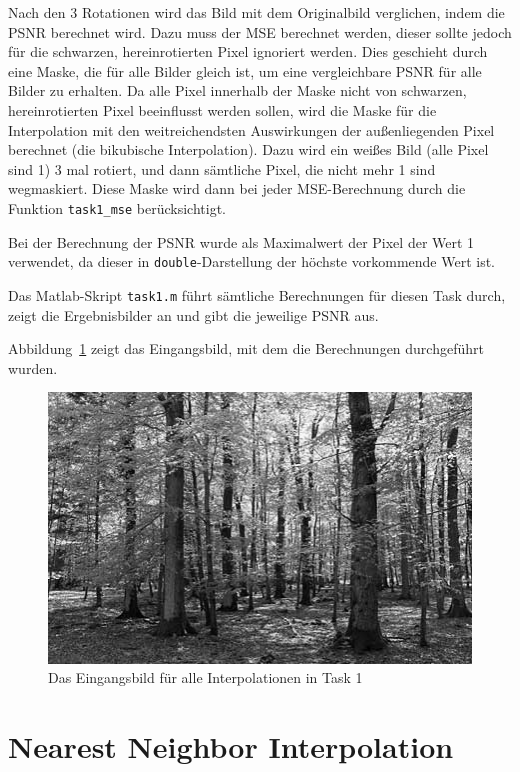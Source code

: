 Nach den 3 Rotationen wird das Bild mit dem Originalbild verglichen, indem die PSNR berechnet wird. Dazu muss der MSE berechnet werden, dieser sollte jedoch für die schwarzen, hereinrotierten Pixel ignoriert werden. Dies geschieht durch eine Maske, die für alle Bilder gleich ist, um eine vergleichbare PSNR für alle Bilder zu erhalten. Da alle Pixel innerhalb der Maske nicht von schwarzen, hereinrotierten Pixel beeinflusst werden sollen, wird die Maske für die Interpolation mit den weitreichendsten Auswirkungen der außenliegenden Pixel berechnet (die bikubische Interpolation). Dazu wird ein weißes Bild (alle Pixel sind 1) 3 mal rotiert, und dann sämtliche Pixel, die nicht mehr 1 sind wegmaskiert. Diese Maske wird dann bei jeder MSE-Berechnung durch die Funktion \texttt{task1\_mse} berücksichtigt.

Bei der Berechnung der PSNR wurde als Maximalwert der Pixel der Wert 1 verwendet, da dieser in \texttt{double}-Darstellung der höchste vorkommende Wert ist.

Das Matlab-Skript \texttt{task1.m} führt sämtliche Berechnungen für diesen Task durch, zeigt die Ergebnisbilder an und gibt die jeweilige PSNR aus.

Abbildung~\ref{fig:t1_original} zeigt das Eingangsbild, mit dem die Berechnungen durchgeführt wurden.

\begin{figure}[htb]
 \centering
 \includegraphics{./img/t1_original.png}
 \caption{Das Eingangsbild für alle Interpolationen in Task 1}
 \label{fig:t1_original}
\end{figure}

\clearpage


\section{Nearest Neighbor Interpolation}

